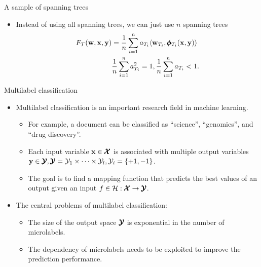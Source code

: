 \documentclass[first=dgreen,second=purple,logo=yellowexc]{aaltoslides}
\begin{document}
\begin{frame}{A sample of spanning trees}
	\begin{itemize}
		\item Instead of using all spanning trees, we can just use $n$ spanning trees
		\begin{align*}
			F_{\mathcal{T}}(\mathbf {w},\mathbf {x},\mathbf {y}) &= \frac{1}{n}\sum_{i=1}^{n}a_{T_i}\langle \mathbf {w}_{T_i}, \pmb \phi_{T_i}(\mathbf {x},\mathbf {y}) \rangle\\
			  &\frac{1}{n}\sum_{i=1}^{n}a_{T_i}^2=1,  \frac{1}{n}\sum_{i=1}^{n}a_{T_i}<1.
		\end{align*}
	\end{itemize}
\end{frame}



%
\begin{frame}{Multilabel classification}
	\begin{itemize}\footnotesize
		\item Multilabel classification is an important research field in machine learning.
		\begin{itemize}\footnotesize
			\item For example, a document can be classified as ``science'', ``genomics'', and ``drug discovery''.
			\item Each input variable $\mathbf {x}\in\pmb {\mathcal{X}}$ is associated with multiple output variables $\mathbf {y}\in\pmb {\mathcal{Y}},\pmb {\mathcal{Y}}=\mathcal{Y}_1\times\cdots\times\mathcal{Y}_l,\mathcal{Y}_i=\{+1,-1\}$.
			\item The goal is to find a mapping function that predicts the best values of an output given an input $f\in\mathcal{H}:\pmb {\mathcal{X}}\rightarrow\pmb {\mathcal{Y}}$.
		\end{itemize}
		\item The central problems of multilabel classification:
		\begin{itemize}\footnotesize
			\item The size of the output space $\pmb {\mathcal{Y}}$ is exponential in the number of microlabels.
			\item The dependency of microlabels needs to be exploited to improve the prediction performance.
		\end{itemize}
	\end{itemize}
\end{frame}
\end{document}
